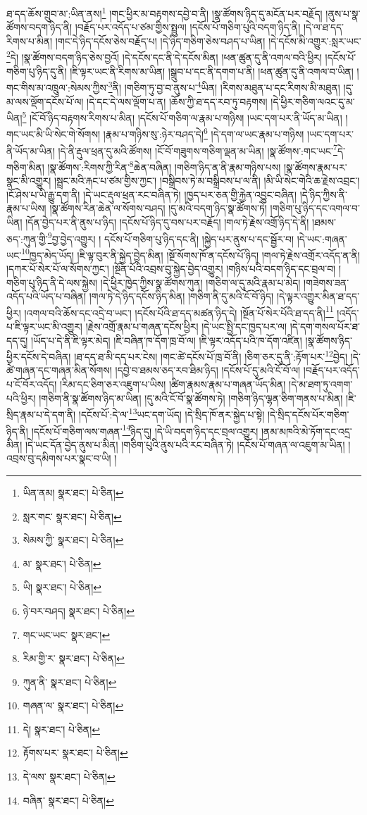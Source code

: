 ཐ་དད་ཆོས་གྲུབ་མ་:ཡིན་ནས།\footnote{ཡིན་ནམ།  སྣར་ཐང་།  པེ་ཅིན། } །གང་ཕྱིར་མ་བརྟགས་དབྱེ་བ་ནི། །སྣ་ཚོགས་ཉིད་དུ་མངོན་པར་བརྗོད། །ནུས་པ་སྣ་ཚོགས་བདག་ཉིད་ནི། །བརྗོད་པར་འདོད་པ་ཙམ་གྱིས་སྤྲུལ། །དངོས་པོ་གཅིག་པུའི་བདག་ཉིད་ནི། །དེ་ལ་ཐ་དད་རིགས་པ་མིན། །གང་དེ་ཉིད་དངོས་ཅེས་བརྗོད་པ། །དེ་ཉིད་གཅིག་ཅེས་བཤད་པ་ཡིན། །དེ་དངོས་མི་འགྱུར་:སླར་ཡང་\footnote{སླར་གང་  སྣར་ཐང་།  པེ་ཅིན། }དེ། །སྣ་ཚོགས་བདག་ཉིད་ཅེས་བྱའོ། །དེ་དངོས་དང་ནི་དེ་དངོས་མིན། །ཕན་ཚུན་དུ་ནི་འགལ་བའི་ཕྱིར། །དངོས་པོ་གཅིག་པུ་ཉིད་དུ་ནི། །ཇི་ལྟར་ཡང་ནི་རིགས་མ་ཡིན། །སྒྲུབ་པ་དང་ནི་དགག་པ་ནི། །ཕན་ཚུན་དུ་ནི་འགལ་བ་ཡིན། །གང་གིས་མ་འཁྲུལ་:སེམས་ཀྱིས་\footnote{སེམས་ཀྱི་  སྣར་ཐང་།  པེ་ཅིན། }ནི། །གཅིག་ཏུ་བྱ་བ་ནུས་པ་\footnote{མ་  སྣར་ཐང་།  པེ་ཅིན། }ཡིན། །རིགས་མཐུན་པ་དང་རིགས་མི་མཐུན། །དུ་མ་ལས་ལྡོག་དངོས་པོ་ལ། །དེ་དང་དེ་ལས་ལྡོག་པ་ན། །ཆོས་ཀྱི་ཐ་དད་རབ་ཏུ་བརྟགས། །དེ་ཕྱིར་གཅིག་ལའང་དུ་མ་ཡིན།\footnote{ཡི།  སྣར་ཐང་།  པེ་ཅིན། } །ངོ་བོ་ཉིད་བརྟགས་རིགས་པ་མིན། །དངོས་པོ་གཅིག་ལ་རྣམ་པ་གཉིས། །ཡང་དག་པར་ནི་ཡོད་མ་ཡིན། །གང་ཡང་མི་ཡི་སེང་གེ་སོགས། །རྣམ་པ་གཉིས་སུ་:ཉེར་བཤད་དེ།\footnote{ཉེ་བར་བཤད།  སྣར་ཐང་།  པེ་ཅིན། } །དེ་དག་ལ་ཡང་རྣམ་པ་གཉིས། །ཡང་དག་པར་ནི་ཡོད་མ་ཡིན། །དེ་ནི་རྡུལ་ཕྲན་དུ་མའི་ཚོགས། །ངོ་བོ་གཟུགས་གཅིག་ལྡན་མ་ཡིན། །སྣ་ཚོགས་:གང་ཡང་\footnote{གང་ཡང་ཡང་  སྣར་ཐང་། }དེ་གཅིག་མིན། །སྣ་ཚོགས་:རིགས་ཀྱི་རིན་\footnote{རིམ་གྱི་ར་  སྣར་ཐང་།  པེ་ཅིན། }ཆེན་བཞིན། །གཅིག་ཉིད་ན་ནི་རྣམ་གཉིས་པས། །སྣ་ཚོགས་རྣམ་པར་སྣང་མི་འགྱུར། །སྦྲང་མའི་རྐང་པ་ཙམ་གྱིས་ཀྱང་། །བསྒྲིབས་ཏེ་མ་བསྒྲིབས་པ་ལ་ནི། །མི་ཡི་སེང་གེའི་ཆ་རྗེས་འབྲང་། །ངོ་ཤེས་པ་ཡི་རྒྱུ་དག་ནི། །དེ་ཡང་རྡུལ་ཕྲན་རང་བཞིན་ཏེ། །ཁྱད་པར་ཅན་གྱི་རྐྱེན་འབྱུང་བཞིན། །དེ་ཉིད་ཀྱིས་ནི་རྣམ་པ་ཡིས། །སྣ་ཚོགས་རིན་ཆེན་ལ་སོགས་བཤད། །དུ་མའི་བདག་ཉིད་སྣ་ཚོགས་ཏེ། །གཅིག་པུ་ཉིད་དང་འགལ་བ་ཡིན། །དོན་བྱེད་པར་ནི་ནུས་པ་ཉིད། །དངོས་པོ་ཉིད་དུ་བས་པར་བརྗོད། །གལ་ཏེ་རྗེས་འགྲོ་ཉིད་དེ་ནི། །ཐམས་ཅད་:ཀུན་གྱི་\footnote{ཀུན་ནི་  སྣར་ཐང་།  པེ་ཅིན། }བྱ་བྱེད་འགྱུར། །
དངོས་པོ་གཅིག་པུ་ཉིད་དང་ནི། །སྐྱེད་པར་ནུས་པ་དང་སྦྱོར་བ། །དེ་ཡང་:གཞན་ཡང་\footnote{གཞན་ལ་  སྣར་ཐང་།  པེ་ཅིན། }ཁྱད་མེད་ཡོད། །ཇི་ལྟ་བུར་ནི་སྐྱེད་བྱེད་མིན། །སྔོ་སོགས་ཁོ་ན་དངོས་པོ་ཉིད། །གལ་ཏེ་རྗེས་འགྲོར་འདོད་ན་ནི། །དཀར་པོ་སེར་པོ་ལ་སོགས་ཀྱང་། །སྔོན་པོའི་འབྲས་བུ་སྐྱེད་བྱེད་འགྱུར། །གཉིས་པའི་བདག་ཉིད་དང་བྲལ་བ། །གཅིག་པུ་ཉིད་ནི་དེ་ལས་སྐྱེས། །དེ་ཕྱིར་ཁྱེད་ཀྱིས་སྣ་ཚོགས་ཀུན། །གཅིག་ལ་དུ་མའི་རྣམ་པ་མེད། །གཟེགས་ཟན་འདོད་པའི་ཡོད་པ་བཞིན། །གལ་ཏེ་དེ་ཉིད་དངོས་ཉིད་མིན། །གཅིག་ནི་དུ་མའི་ངོ་བོ་ཉིད། །དེ་ལྟར་འགྱུར་མིན་ཐ་དད་ཕྱིར། །འགལ་བའི་ཆོས་དང་འདྲེ་བ་ཡང་། །དངོས་པོའི་ཐ་དད་མཚན་ཉིད་དེ། །སྔོན་པོ་སེར་པོའི་ཐ་དད་ནི།\footnote{དེ།  སྣར་ཐང་།  པེ་ཅིན། } །འདོད་པ་ཇི་ལྟར་ཡང་མི་འགྱུར། །རྗེས་འགྲོ་རྣམ་པ་གཞན་དངོས་ཕྱིར། །དེ་ཡང་སྤྱི་དང་ཁྱད་པར་ལ། །དེ་དག་གསལ་པོར་ཐ་དད་དུ། །ཡོད་པ་དེ་ནི་ཇི་ལྟར་མེད། །ཇི་བཞིན་ཁ་དོག་ཁྲ་བོ་ལ། །ཇི་ལྟར་འདོད་པའི་ཁ་དོག་འཛིན། །སྣ་ཚོགས་ཉིད་ཕྱིར་དངོས་དེ་བཞིན། །ཐ་དད་ཐ་མི་དད་པར་ངེས། །གང་ཚེ་དངོས་པོ་ཁྲ་བོ་ནི། །ཅིག་ཅར་དུ་ནི་:རྟོག་པར་\footnote{རྟོགས་པར་  སྣར་ཐང་།  པེ་ཅིན། }བྱེད། །དེ་ཚེ་གཞན་དང་གཞན་མིན་སོགས། །དབྱེ་བ་ཐམས་ཅད་རབ་ཐིམ་ཉིད། །དངོས་པོ་དུ་མའི་ངོ་བོ་ལ། །བརྗོད་པར་འདོད་པ་ངོ་བོར་འདོད། །རིམ་དང་ཅིག་ཅར་འཇུག་པ་ཡིས། །ཚིག་རྣམས་རྣམ་པ་གཞན་ཡོད་མིན། །དེ་མ་ཐག་ཏུ་འགག་པའི་ཕྱིར། །གཅིག་ནི་སྣ་ཚོགས་ཉིད་མ་ཡིན། །དུ་མའི་ངོ་བོ་སྣ་ཚོགས་ཏེ། །གཅིག་ཉིད་ལྷན་ཅིག་གནས་པ་མིན། །ཇི་སྲིད་རྣམ་པ་དེ་དག་ནི། །དངོས་པོ་:དེ་ལ་\footnote{དེ་ལས་  སྣར་ཐང་།  པེ་ཅིན། }ཡང་དག་ཡོད། །དེ་སྲིད་ཁོ་ནར་སྐྱེད་པ་སྟེ། །དེ་སྲིད་དངོས་པོར་གཅིག་ཉིད་ནི། །དངོས་པོ་གཅིག་ལས་གཞན་\footnote{བཞིན་  སྣར་ཐང་།  པེ་ཅིན། }ཉིད་དུ། །དེ་ཡི་བདག་ཉིད་དང་བྲལ་འགྱུར། །ནམ་མཁའི་མེ་ཏོག་དང་འདྲ་མིན། །དེ་ཡང་དོན་བྱེད་ནུས་པ་མིན། །གཅིག་པུའི་ནུས་པའི་རང་བཞིན་ཏེ། །དངོས་པོ་གཞན་ལ་འཇུག་མ་ཡིན། །འབྲས་བུ་དམིགས་པར་སྣང་བ་ཡི། །
